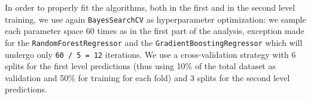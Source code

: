     In order to properly fit the algorithms, both in the first and in the second level training, we use again \texttt{BayesSearchCV} as hyperparameter optimization: we sample each parameter space 60 times as in the first part of the analysis, exception made for the \texttt{RandomForestRegressor} and the \texttt{GradientBoostingRegressor} which will undergo only \texttt{60 / 5 = 12} iterations. We use a cross-validation strategy with 6 splits for the first level predictions (thus using 10\% of the total dataset as validation and 50\% for training for each fold) and 3 splits for the second level predictions.
